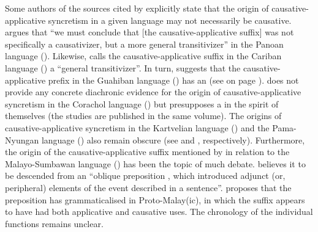 Some authors of the sources cited by \cite{shibatani:pardeshi:2002} explicitly state that the origin of causative-applicative syncretism in a given language may not necessarily be causative. \cite[396]{fleck:2002} argues that “we must conclude that [the causative-applicative suffix]  was not specifically a causativizer, but a more general transitivizer” in the Panoan language  (). Likewise, \cite[344]{stefanowitsch:2002} calls the causative-applicative suffix  in the Cariban language  () a “general transitivizer”. In turn, \cite{queixalos:2002} suggests that the causative-applicative prefix  in the Guahiban language  () has an  (see  on page \pageref{tab:ch7:appl-caus-sikuani}). \cite[228]{vazquez-soto:2002} does not provide any concrete diachronic evidence for the origin of causative-applicative syncretism in the Corachol language  () but presupposes a  in the spirit of \cite{shibatani:pardeshi:2002} themselves (the studies are published in the same volume). The origins of causative-applicative syncretism in the Kartvelian language  () and the Pama-Nyungan language  () also remain obscure (see \citealt{kulikov:1993} and \citealt{austin:2005}, respectively). Furthermore, the origin of the causative-applicative suffix  mentioned by \cite{shibatani:pardeshi:2002} in relation to the Malayo-Sumbawan language  () has been the topic of much debate. \cite[438]{kikusawa:2012} believes it to be descended from an “oblique preposition , which introduced adjunct (or, peripheral) elements of the event described in a sentence”. \cite[439]{kikusawa:2012} proposes that the preposition has grammaticalised in Proto-Malay(ic), in which the suffix  appears to have had both applicative and causative uses. The chronology of the individual functions remains unclear.

